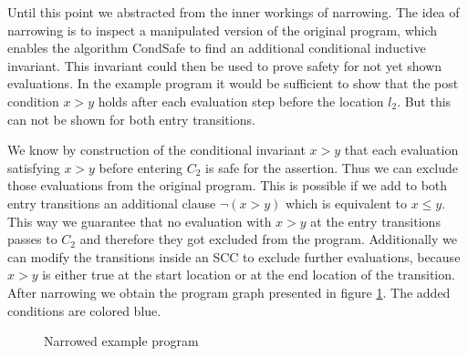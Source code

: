 Until this point we abstracted from the inner workings of narrowing.
The idea of narrowing is to inspect a manipulated version of the original program, which enables the algorithm CondSafe to find an additional conditional inductive invariant.
This invariant could then be used to prove safety for not yet shown evaluations.
In the example program it would be sufficient to show that the post condition $x > y$ holds after each evaluation step before the location $l_2$.
But this can not be shown for both entry transitions.

We know by construction of the conditional invariant $x > y$ that each evaluation satisfying $x > y$ before entering $C_2$ is safe for the assertion.
Thus we can exclude those evaluations from the original program.
This is possible if we add to both entry transitions an additional clause $\neg (x > y)$ which is equivalent to $x \leq y$.
This way we guarantee that no evaluation with $x > y$ at the entry transitions passes to $C_2$ and therefore they got excluded from the program.
Additionally we can modify the transitions inside an SCC to exclude further evaluations, because $x > y$ is either true at the start location or at the end location of the transition.
After narrowing we obtain the program graph presented in figure \ref{fig:narrowed}. The added conditions are colored blue.

\begin{figure}
\centering
{}
\caption{Narrowed example program}
\label{fig:narrowed}
\end{figure}

